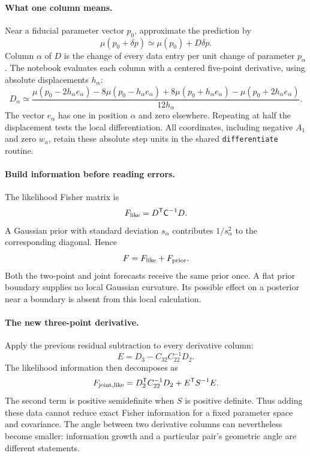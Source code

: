 \documentclass[11pt]{article}
\newcommand{\Cov}{\mathsf C}
\newcommand{\T}{^{\mathsf T}}
\begin{document}
\paragraph{What one column means.}
Near a fiducial parameter vector $p_0$, approximate the prediction by
\begin{equation}
 \mu(p_0+\delta p)\simeq\mu(p_0)+D\delta p.
\end{equation}
Column $\alpha$ of $D$ is the change of every data entry per unit change of
parameter $p_\alpha$. The notebook evaluates each column with a centered
five-point derivative, using absolute displacements $h_\alpha$:
\begin{equation}
 D_\alpha\simeq
 \frac{\mu(p_0-2h_\alpha e_\alpha)-8\mu(p_0-h_\alpha e_\alpha)
 +8\mu(p_0+h_\alpha e_\alpha)-\mu(p_0+2h_\alpha e_\alpha)}{12h_\alpha}.
\end{equation}
The vector $e_\alpha$ has one in position $\alpha$ and zero elsewhere.
Repeating at half the displacement tests the local differentiation. All
coordinates, including negative $A_1$ and zero $w_a$, retain these absolute
step units in the shared \texttt{differentiate} routine.

\paragraph{Build information before reading errors.}
The likelihood Fisher matrix is
\begin{equation}
 F_{\rm like}=D\T\Cov^{-1}D.
\end{equation}
A Gaussian prior with standard deviation $s_\alpha$ contributes
$1/s_\alpha^2$ to the corresponding diagonal. Hence
\begin{equation}
 F=F_{\rm like}+F_{\rm prior}.
\end{equation}
Both the two-point and joint forecasts receive the same prior once. A flat
prior boundary supplies no local Gaussian curvature. Its possible effect
on a posterior near a boundary is absent from this local calculation.

\paragraph{The new three-point derivative.}
Apply the previous residual subtraction to every derivative column:
\begin{equation}
 E=D_3-C_{32}C_{22}^{-1}D_2.
\end{equation}
The likelihood information then decomposes as
\begin{equation}
 F_{\rm joint,like}=D_2\T C_{22}^{-1}D_2+E\T S^{-1}E.
\end{equation}
The second term is positive semidefinite when $S$ is positive definite.
Thus adding these data cannot reduce exact Fisher information for a fixed
parameter space and covariance. The angle between two derivative columns
can nevertheless become smaller: information growth and a particular
pair's geometric angle are different statements.
\end{document}
